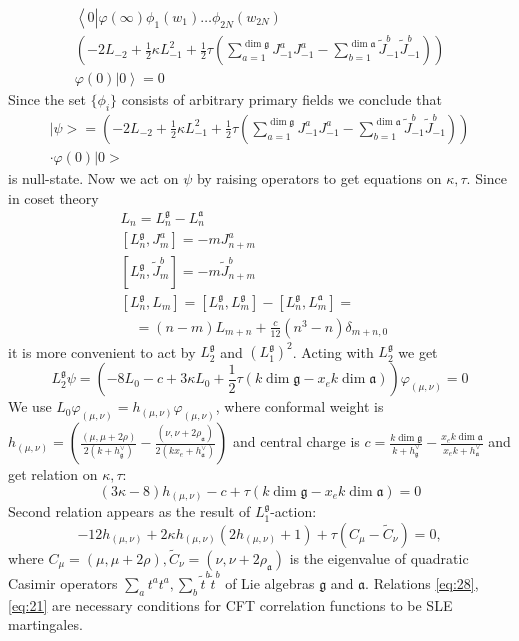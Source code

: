 \documentclass{jetpl}
\newcommand{\gf}{\mathfrak{g}}
\newcommand{\af}{\mathfrak{a}}
\begin{document}
\begin{multline}
  \label{eq:7}
  \left<0\left|\varphi(\infty)\phi_{1}(w_{1})\dots\phi_{2N}(w_{2N})\right.\right.\\
  \left(-2L_{-2}+\frac{1}{2}\kappa L_{-1}^{2}+\frac{1}{2}\tau \left(\sum_{a=1}^{\dim\gf}J^{a}_{-1}J^{a}_{-1}-\sum_{b=1}^{\dim\af}\tilde{J}^{b}_{-1}\tilde{J}^{b}_{-1}\right)\right)\\
\left.\varphi(0)|0\right>=0
\end{multline}
Since the set $\{\phi_{i}\}$ consists of arbitrary primary fields we conclude that 
\begin{multline}
|\psi>=\left(-2L_{-2}+\frac{1}{2}\kappa L_{-1}^{2}+\frac{1}{2}\tau \left(\sum_{a=1}^{\dim\gf}J^{a}_{-1}J^{a}_{-1}-\sum_{b=1}^{\dim\af}\tilde{J}^{b}_{-1}\tilde{J}^{b}_{-1}\right)\right)\\
\cdot\varphi(0)|0>
\end{multline}
is null-state. Now we act on $\psi$ by raising operators to get equations on $\kappa,\tau$. Since in coset theory
\begin{equation}
  \label{eq:18}
\begin{array}{ll}
  L_{n}= L_{n}^{\gf}-L_{n}^{\af} &\\
  \left[L_{n}^{\gf},J^{a}_{m}\right]= -m J^{a}_{n+m}&\\
  \left[L_{n}^{\gf},\tilde{J}^{b}_{m}\right]=-m\tilde{J}^{b}_{n+m}&\\
  \left[L_{n}^{\gf},L_{m}\right]=[L_{n}^{\gf},L_{m}^{\gf}]-[L_{n}^{\gf},L_{m}^{\af}]=&\\
  \quad =(n-m)L_{m+n}+\frac{c}{12}(n^{3}-n)\delta_{m+n,0}&
\end{array}
\end{equation}
 it is more convenient to act by $L_{2}^{\gf}$ and $\left(L_{1}^{\gf}\right)^{2}$. 
 Acting with $L_{2}^{\gf}$ we get
\begin{equation*}
  L_{2}^{\gf}\psi= \left(-8 L_{0}-c+ 3 \kappa L_{0}+\frac{1}{2}\tau (k \dim\gf-x_{e}k\dim\af)\right) \varphi_{(\mu,\nu)}=0
\end{equation*}
We use $L_{0} \varphi_{(\mu,\nu)}=h_{(\mu,\nu)} \varphi_{(\mu,\nu)}$, where conformal weight is $h_{(\mu,\nu)}= \left(\frac{(\mu,\mu+2\rho)}{2(k+h^{\vee}_{\gf})}-\frac{(\nu,\nu+2\rho_{\af})}{2(k x_{e}+h^{\vee}_{\af})}\right)$ and central charge is $c=\frac{k\dim \gf}{k+h^{\vee}_{\gf}}-\frac{x_{e}k\dim \af}{x_{e} k+h^{\vee}_{\af}}$ and get relation on $\kappa,\tau$:
\begin{equation}
  \label{eq:28} (3\kappa-8)h_{(\mu,\nu)}-c+\tau (k\dim\gf-x_{e}k\dim\af) =0
\end{equation}
Second relation appears as the result of $L_{1}^{\gf}$-action:
\begin{equation}
  \label{eq:21}
 -12 h_{(\mu,\nu)}+2\kappa h_{(\mu,\nu)} (2h_{(\mu,\nu)}+1) + \tau
(C_{\mu}-\tilde{C}_{\nu})=0,
\end{equation}
 where $C_{\mu}=(\mu,\mu+2\rho), \tilde{C}_{\nu}=(\nu,\nu+2\rho_{\af})$ is the eigenvalue of quadratic Casimir operators $\sum_{a}t^{a}t^{a}, \sum_{b}\tilde{t}^{b}\tilde{t}^{b}$ of Lie algebras $\gf$ and $\af$.
Relations \eqref{eq:28},\eqref{eq:21} are necessary conditions for CFT correlation functions to be SLE martingales. 
\end{document}
